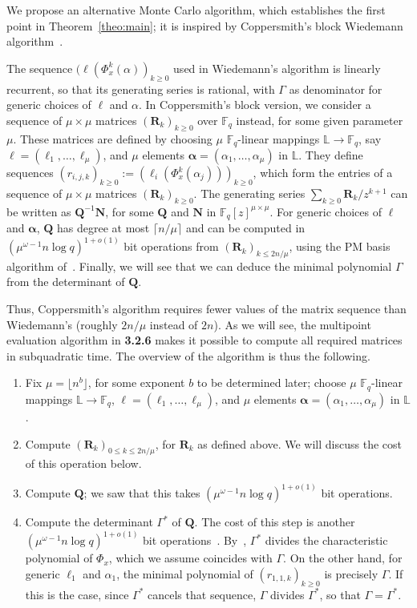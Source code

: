\documentclass[sigconf]{acmart}
\newcommand{\F}{\mathbb{F}}
\renewcommand{\L}{\mathbb{L}}
\begin{document}
We propose an alternative Monte Carlo algorithm, which
establishes the first point in Theorem~\ref{theo:main}; it is
inspired by Coppersmith's block Wiedemann
algorithm~\cite{Coppersmith94}. 

The sequence $(\ell(\Phi_x^k(\alpha))_{k\ge 0}$ used in Wiedemann's
algorithm is linearly recurrent, so that its generating series is
rational, with $\Gamma$ as denominator for generic choices of $\ell$
and $\alpha$. In Coppersmith's block version, we consider a sequence
of $\mu \times \mu$ matrices $({\bm R}_k)_{k \ge 0}$ over $\F_q$
instead, for some given parameter $\mu$. These matrices are defined by
choosing $\mu$ $\F_q$-linear mappings $\L\to\F_q$, say ${\bm
  \ell}=(\ell_1,\dots,\ell_\mu)$, and $\mu$ elements ${\bm
  \alpha}=(\alpha_1,\dots,\alpha_\mu)$ in $\L$.  They define sequences
$(r_{i,j,k})_{k \ge 0} := (\ell_i(\Phi_x^k(\alpha_j)))_{k \ge 0}$,
which form the entries of a sequence of $\mu \times \mu$ matrices
$({\bm R}_k)_{k \ge 0}$.  The generating series $\sum_{k \ge 0} {\bm
  R}_k / z^{k+1}$ can be written as ${\bm Q}^{-1}{\bm N}$, for some
${\bm Q}$ and ${\bm N}$ in $\F_q[z]^{\mu \times \mu}$.  For generic
choices of ${\bm \ell}$ and ${\bm \alpha}$, ${\bm Q}$ has degree at
most $\lceil n/\mu \rceil$ and can be computed in $(\mu^{\omega-1} n \log
q)^{1+o(1)}$ bit operations from $({\bm R}_k)_{k \le 2n/\mu}$, using
the PM basis algorithm of~\cite{GiJeVi03}. Finally, we will see that
we can deduce the minimal polynomial $\Gamma$ from the determinant of
${\bm Q}$.


Thus, Coppersmith's algorithm requires fewer values of the matrix
sequence than Wiedemann's (roughly $2n/\mu$ instead of $2n$). As we
will see, the multipoint evaluation algorithm in {\bf 3.2.6} makes it
possible to compute all required matrices in subquadratic time.
The overview of the algorithm is thus the following.
\begin{enumerate}
\item Fix $\mu=\lfloor n^{b} \rfloor$, for some exponent $b$ to be
  determined later; choose $\mu$ $\F_q$-linear mappings $\L\to\F_q$,
 ${\bm \ell}=(\ell_1,\dots,\ell_\mu)$, and $\mu$ elements ${\bm
    \alpha}=(\alpha_1,\dots,\alpha_\mu)$ in $\L$.  
\item Compute $({\bm R}_k)_{0 \le k \le 2n/\mu}$, for ${\bm R}_k$ as
  defined above. We will discuss the cost of this operation below.
\item Compute ${\bm Q}$; we saw that this takes $(\mu^{\omega-1} n \log q)^{1+o(1)}$ bit operations.
\item Compute the determinant $\Gamma^*$ of ${\bm Q}$.  The cost of
  this step is another $(\mu^{\omega-1} n \log q)^{1+o(1)}$ bit
  operations~\cite{LaNeZh17}.  By~\cite[Th.~2.12]{KaVi04}, $\Gamma^*$
  divides the characteristic polynomial of $\Phi_x$, which we assume
  coincides with $\Gamma$. On the other hand, for generic $\ell_1$ and
  $\alpha_1$, the minimal polynomial of $(r_{1,1,k})_{k \ge 0}$ is
  precisely $\Gamma$. If this is the case, since $\Gamma^*$ cancels
  that sequence, $\Gamma$ divides $\Gamma^*$, so that $\Gamma =
  \Gamma^*$.

\end{enumerate}
\end{document}
